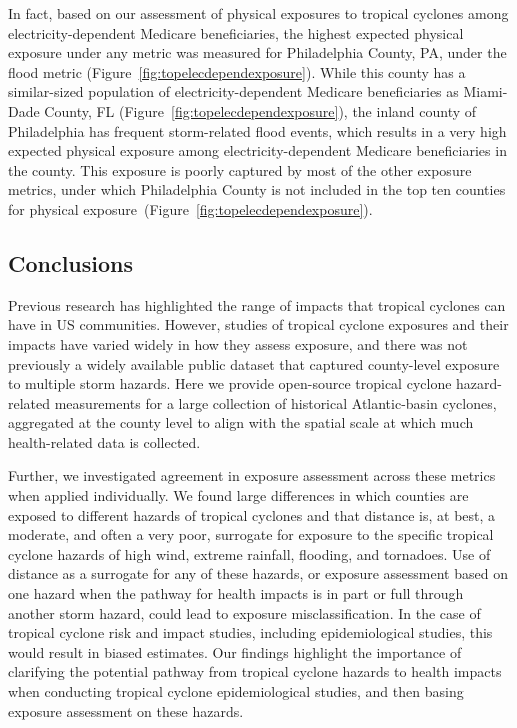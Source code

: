 In fact, based on our assessment of physical exposures to tropical cyclones
among electricity-dependent Medicare beneficiaries, the highest expected
physical exposure under any metric was measured for Philadelphia County, PA,
under the flood metric (Figure~\ref{fig:topelecdependexposure}).  While this
county has a similar-sized population of electricity-dependent Medicare
beneficiaries as Miami-Dade County, FL
(Figure~\ref{fig:topelecdependexposure}), the inland county of Philadelphia has
frequent storm-related flood events, which results in a very high expected
physical exposure among electricity-dependent Medicare beneficiaries in the
county. This exposure is poorly captured by most of the other exposure metrics,
under which Philadelphia County is not included in the top ten counties for
physical exposure~(Figure~\ref{fig:topelecdependexposure}).

\subsection*{Conclusions}

Previous research has highlighted the range of impacts that tropical cyclones
can have in \ac{US} communities. However, studies of tropical cyclone exposures
and their impacts have varied widely in how they assess exposure, and there was
not previously a widely available public dataset that captured county-level
exposure to multiple storm hazards. Here we provide open-source tropical
cyclone hazard-related measurements for a large collection of historical
Atlantic-basin cyclones, aggregated at the county level to align with the
spatial scale at which much health-related data is collected.

Further, we investigated agreement in exposure assessment across these metrics
when applied individually. We found large differences in which counties are
exposed to different hazards of tropical cyclones and that distance is, at
best, a moderate, and often a very poor, surrogate for exposure to the specific
tropical cyclone hazards of high wind, extreme rainfall, flooding, and
tornadoes. Use of distance as a surrogate for any of these hazards, or exposure
assessment based on one hazard when the pathway for health impacts is in part
or full through another storm hazard, could lead to exposure misclassification.
In the case of tropical cyclone risk and impact studies, including
epidemiological studies, this would result in biased estimates.  Our findings
highlight the importance of clarifying the potential pathway from tropical
cyclone hazards to health impacts when conducting tropical cyclone
epidemiological studies, and then basing exposure assessment on these hazards.

